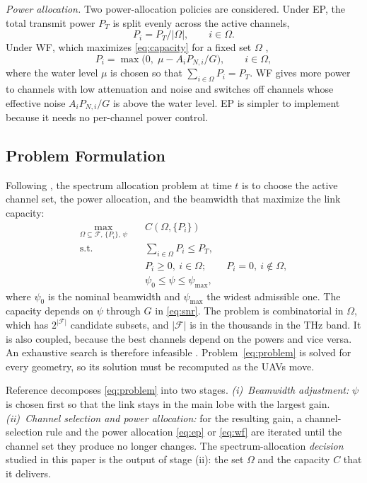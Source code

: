 \documentclass[correspondence]{IEEEtaes}
\begin{document}
\emph{Power allocation.} Two power-allocation policies are considered. Under EP, the total
transmit power $P_T$ is split evenly across the active channels,
\begin{equation}
P_i=P_T/|\Omega|,\qquad i\in\Omega .
\label{eq:ep}
\end{equation}
Under WF, which maximizes \eqref{eq:capacity} for a fixed set $\Omega$
\cite{goldsmith2005},
\begin{equation}
P_i=\max\!\big(0,\;\mu-A_iP_{N,i}/G\big),\qquad i\in\Omega ,
\label{eq:wf}
\end{equation}
where the water level $\mu$ is chosen so that $\sum_{i\in\Omega}P_i=P_T$. WF gives more
power to channels with low attenuation and noise and switches off channels whose
effective noise $A_iP_{N,i}/G$ is above the water level. EP is simpler to implement
because it needs no per-channel power control.

\subsection{Problem Formulation}
\label{sec:problem}
Following \cite{saeed2024maxactive}, the spectrum allocation problem at time $t$ is to
choose the active channel set, the power allocation, and the beamwidth that maximize the
link capacity:
\begin{subequations}
\label{eq:problem}
\begin{align}
\max_{\Omega\subseteq\mathcal{F},\,\{P_i\},\,\psi}\quad & C(\Omega,\{P_i\})
\label{eq:obj}\\
\text{s.t.}\quad & \textstyle\sum_{i\in\Omega}P_i\le P_T,
\label{eq:c1}\\
& P_i\ge0,\ i\in\Omega;\qquad P_i=0,\ i\notin\Omega,
\label{eq:c2}\\
& \psi_0\le\psi\le\psi_{\max},
\label{eq:c3}
\end{align}
\end{subequations}
where $\psi_0$ is the nominal beamwidth and $\psi_{\max}$ the widest admissible one. The
capacity depends on $\psi$ through $G$ in \eqref{eq:snr}. The problem is combinatorial in
$\Omega$, which has $2^{|\mathcal{F}|}$ candidate subsets, and $|\mathcal{F}|$ is in the
thousands in the THz band. It is also coupled, because the best channels depend on the
powers and vice versa. An exhaustive search is therefore infeasible
\cite{saeed2024maxactive}. Problem~\eqref{eq:problem} is solved for every geometry, so its
solution must be recomputed as the UAVs move.

Reference \cite{saeed2024maxactive} decomposes \eqref{eq:problem} into two stages.
\emph{(i)~Beamwidth adjustment:} $\psi$ is chosen first so that the link stays in the
main lobe with the largest gain. \emph{(ii)~Channel selection and power allocation:} for
the resulting gain, a channel-selection rule and the power allocation \eqref{eq:ep} or
\eqref{eq:wf} are iterated until the channel set they produce no longer changes. The
spectrum-allocation \emph{decision} studied in this paper is the output of stage (ii): the
set $\Omega$ and the capacity $C$ that it delivers.
\end{document}
